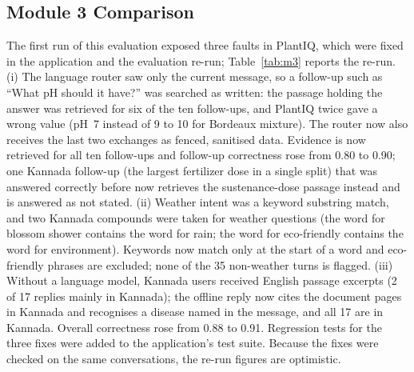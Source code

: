 \subsection{Module 3 Comparison}
The first run of this evaluation exposed three faults in PlantIQ, which were fixed in the application and the evaluation
re-run; Table~\ref{tab:m3} reports the re-run. (i) The language router saw only the current message, so a follow-up
such as ``What pH should it have?'' was searched as written: the passage holding the answer was retrieved for six of
the ten follow-ups, and PlantIQ twice gave a wrong value (pH~7 instead of 9 to 10 for Bordeaux mixture). The router now also
receives the last two exchanges as fenced, sanitised data. Evidence is now retrieved for all ten follow-ups and follow-up
correctness rose from 0.80 to 0.90; one Kannada follow-up (the largest fertilizer dose in a single split) that was
answered correctly before now retrieves the sustenance-dose passage instead and is answered as not stated. (ii) Weather
intent was a keyword substring match, and two Kannada compounds were taken for weather questions (the word for blossom
shower contains the word for rain; the word for eco-friendly contains the word for environment). Keywords now match only
at the start of a word and eco-friendly phrases are excluded; none of the 35 non-weather turns is flagged. (iii) Without
a language model, Kannada users received English passage excerpts (2 of 17 replies mainly in Kannada); the offline reply
now cites the document pages in Kannada and recognises a disease named in the message, and all 17 are in Kannada.
Overall correctness rose from 0.88 to 0.91. Regression tests for the three fixes were added to the application's test
suite. Because the fixes were checked on the same conversations, the re-run figures are optimistic.

